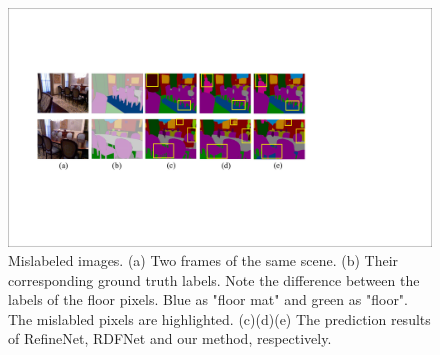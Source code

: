 \begin{figure}[!htbp]
	\setlength{\abovecaptionskip}{-0.2cm}
	\setlength{\belowcaptionskip}{-10cm}
	\centering
	\includegraphics[scale=0.4]{figure/Mislabels.pdf}
	\caption{Mislabeled images. (a) Two frames of the same scene. (b) Their corresponding ground truth labels. Note the difference between the labels of the floor pixels. Blue as "floor mat" and green as "floor".  The mislabled pixels are highlighted. (c)(d)(e) The prediction results of RefineNet, RDFNet and our method, respectively.}
	\label{fig:mislabels}
\end{figure}
%


